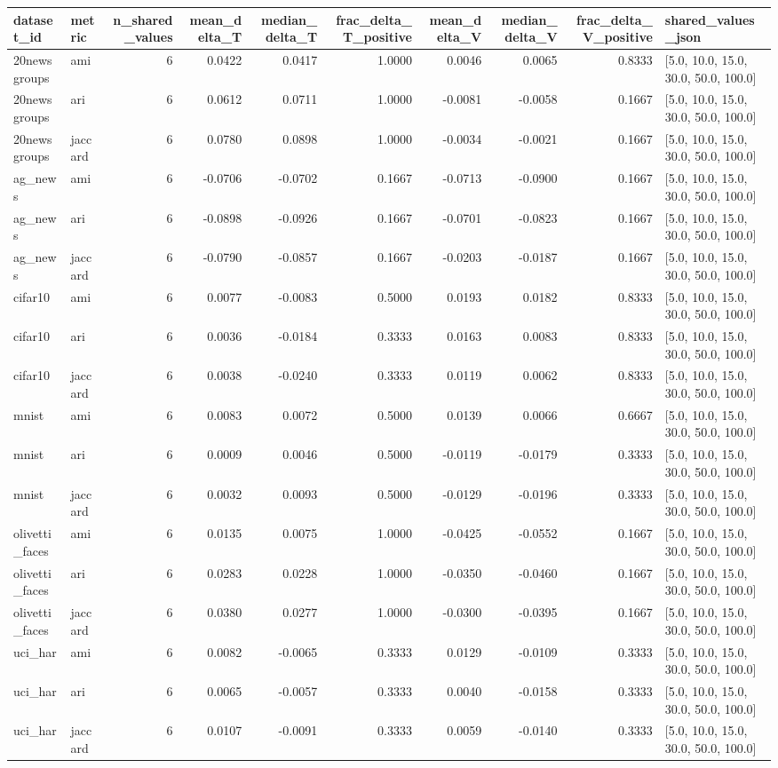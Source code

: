 \begin{tabular}{llrrrrrrrl}
\toprule
dataset_id & metric & n_shared_values & mean_delta_T & median_delta_T & frac_delta_T_positive & mean_delta_V & median_delta_V & frac_delta_V_positive & shared_values_json \\
\midrule
20newsgroups & ami & 6 & 0.0422 & 0.0417 & 1.0000 & 0.0046 & 0.0065 & 0.8333 & [5.0, 10.0, 15.0, 30.0, 50.0, 100.0] \\
20newsgroups & ari & 6 & 0.0612 & 0.0711 & 1.0000 & -0.0081 & -0.0058 & 0.1667 & [5.0, 10.0, 15.0, 30.0, 50.0, 100.0] \\
20newsgroups & jaccard & 6 & 0.0780 & 0.0898 & 1.0000 & -0.0034 & -0.0021 & 0.1667 & [5.0, 10.0, 15.0, 30.0, 50.0, 100.0] \\
ag_news & ami & 6 & -0.0706 & -0.0702 & 0.1667 & -0.0713 & -0.0900 & 0.1667 & [5.0, 10.0, 15.0, 30.0, 50.0, 100.0] \\
ag_news & ari & 6 & -0.0898 & -0.0926 & 0.1667 & -0.0701 & -0.0823 & 0.1667 & [5.0, 10.0, 15.0, 30.0, 50.0, 100.0] \\
ag_news & jaccard & 6 & -0.0790 & -0.0857 & 0.1667 & -0.0203 & -0.0187 & 0.1667 & [5.0, 10.0, 15.0, 30.0, 50.0, 100.0] \\
cifar10 & ami & 6 & 0.0077 & -0.0083 & 0.5000 & 0.0193 & 0.0182 & 0.8333 & [5.0, 10.0, 15.0, 30.0, 50.0, 100.0] \\
cifar10 & ari & 6 & 0.0036 & -0.0184 & 0.3333 & 0.0163 & 0.0083 & 0.8333 & [5.0, 10.0, 15.0, 30.0, 50.0, 100.0] \\
cifar10 & jaccard & 6 & 0.0038 & -0.0240 & 0.3333 & 0.0119 & 0.0062 & 0.8333 & [5.0, 10.0, 15.0, 30.0, 50.0, 100.0] \\
mnist & ami & 6 & 0.0083 & 0.0072 & 0.5000 & 0.0139 & 0.0066 & 0.6667 & [5.0, 10.0, 15.0, 30.0, 50.0, 100.0] \\
mnist & ari & 6 & 0.0009 & 0.0046 & 0.5000 & -0.0119 & -0.0179 & 0.3333 & [5.0, 10.0, 15.0, 30.0, 50.0, 100.0] \\
mnist & jaccard & 6 & 0.0032 & 0.0093 & 0.5000 & -0.0129 & -0.0196 & 0.3333 & [5.0, 10.0, 15.0, 30.0, 50.0, 100.0] \\
olivetti_faces & ami & 6 & 0.0135 & 0.0075 & 1.0000 & -0.0425 & -0.0552 & 0.1667 & [5.0, 10.0, 15.0, 30.0, 50.0, 100.0] \\
olivetti_faces & ari & 6 & 0.0283 & 0.0228 & 1.0000 & -0.0350 & -0.0460 & 0.1667 & [5.0, 10.0, 15.0, 30.0, 50.0, 100.0] \\
olivetti_faces & jaccard & 6 & 0.0380 & 0.0277 & 1.0000 & -0.0300 & -0.0395 & 0.1667 & [5.0, 10.0, 15.0, 30.0, 50.0, 100.0] \\
uci_har & ami & 6 & 0.0082 & -0.0065 & 0.3333 & 0.0129 & -0.0109 & 0.3333 & [5.0, 10.0, 15.0, 30.0, 50.0, 100.0] \\
uci_har & ari & 6 & 0.0065 & -0.0057 & 0.3333 & 0.0040 & -0.0158 & 0.3333 & [5.0, 10.0, 15.0, 30.0, 50.0, 100.0] \\
uci_har & jaccard & 6 & 0.0107 & -0.0091 & 0.3333 & 0.0059 & -0.0140 & 0.3333 & [5.0, 10.0, 15.0, 30.0, 50.0, 100.0] \\
\bottomrule
\end{tabular}
